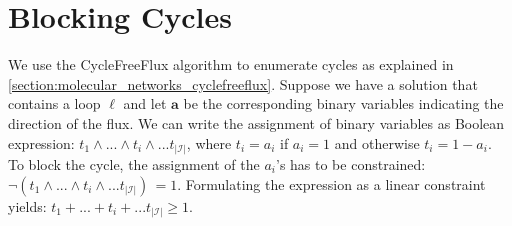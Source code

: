 \section{Blocking Cycles} \label{section:blocking_cycles}
We use the \textsf{CycleFreeFlux} algorithm to enumerate cycles as explained in \cref{section:molecular_networks_cyclefreeflux}.
Suppose we have a solution that contains a loop $\boldsymbol \ell$ %
and let $\boldsymbol a$ be the corresponding binary variables indicating the direction of the flux. We can write the assignment of binary variables as Boolean expression: $t_1 \land ... \land t_i \land ... t_{|\mathcal{I}|}$, where $t_i = a_i$ if $a_i=1$ and otherwise $t_i = 1 -a_i$.
To block the cycle, the assignment of the $a_i$'s has to be constrained: 
    $\neg (t_1 \land ... \land t_i \land ... t_{|\mathcal{I}|}) \, = 1$.
Formulating the expression as a linear constraint yields:
    $t_1 + ... + t_i + ... t_{|\mathcal{I}|} \geq 1$.

